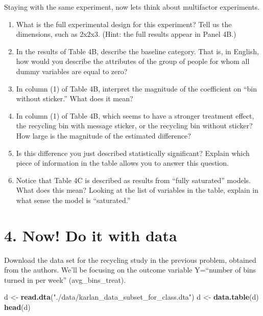 \documentclass[
]{article}
\newenvironment{Shaded}{\begin{snugshade}}{\end{snugshade}}
\newcommand{\KeywordTok}[1]{\textcolor[rgb]{0.13,0.29,0.53}{\textbf{#1}}}
\newcommand{\NormalTok}[1]{#1}
\newcommand{\StringTok}[1]{\textcolor[rgb]{0.31,0.60,0.02}{#1}}
\providecommand{\tightlist}{%
  \setlength{\itemsep}{0pt}\setlength{\parskip}{0pt}}
\begin{document}
Staying with the same experiment, now lets think about multifactor
experiments.

\begin{enumerate}
\def\labelenumi{\arabic{enumi}.}
\tightlist
\item
  What is the full experimental design for this experiment? Tell us the
  dimensions, such as 2x2x3. (Hint: the full results appear in Panel
  4B.)
\item
  In the results of Table 4B, describe the baseline category. That is,
  in English, how would you describe the attributes of the group of
  people for whom all dummy variables are equal to zero?
\item
  In column (1) of Table 4B, interpret the magnitude of the coefficient
  on ``bin without sticker.'' What does it mean?
\item
  In column (1) of Table 4B, which seems to have a stronger treatment
  effect, the recycling bin with message sticker, or the recycling bin
  without sticker? How large is the magnitude of the estimated
  difference?
\item
  Is this difference you just described statistically significant?
  Explain which piece of information in the table allows you to answer
  this question.
\item
  Notice that Table 4C is described as results from ``fully saturated''
  models. What does this mean? Looking at the list of variables in the
  table, explain in what sense the model is ``saturated.''
\end{enumerate}

\hypertarget{now-do-it-with-data}{%
\section{4. Now! Do it with data}\label{now-do-it-with-data}}

Download the data set for the recycling study in the previous problem,
obtained from the authors. We'll be focusing on the outcome variable
Y=``number of bins turned in per week'' (avg\_bins\_treat).

\begin{Shaded}
\begin{Highlighting}[]
\NormalTok{d <-}\StringTok{ }\KeywordTok{read.dta}\NormalTok{(}\StringTok{"./data/karlan_data_subset_for_class.dta"}\NormalTok{)}
\NormalTok{d <-}\StringTok{ }\KeywordTok{data.table}\NormalTok{(d)}
\KeywordTok{head}\NormalTok{(d)}
\end{Highlighting}
\end{Shaded}
\end{document}
